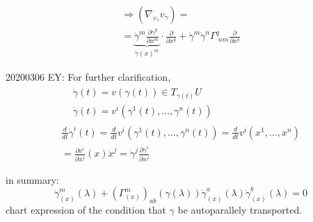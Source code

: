 \[
\begin{gathered}
\Longrightarrow (\nabla_{v_{\gamma}} v_{\gamma}) =  \\
 = \underbrace{ \dot{\gamma}^m \frac{\partial \dot{\gamma}^q }{ \partial x^m} }_{\ddot{\gamma}(x)^m } \cdot \frac{\partial }{ \partial x^q} + \dot{\gamma}^m \dot{\gamma}^n \Gamma^q_{ \, \, nm} \frac{\partial}{\partial x^q}
\end{gathered}
\]

20200306 EY: For further clarification, 
\[
\begin{gathered} 
\begin{aligned} 
 	& \dot{\gamma}(t) = v(\gamma(t)) \in T_{\gamma(t)}U \\ 
	& \dot{\gamma}(t) = v^i(\gamma^1(t), \dots, \gamma^n(t))
\end{aligned} \\ 
 \frac{d}{dt} \dot{\gamma}^i(t) = \frac{d}{dt} v^i(\gamma^1(t), \dots , \gamma^n(t)) = \frac{d}{dt} v^i(x^1 , \dots , x^n) \\
 = \frac{\partial v^i}{\partial x^j}(x) \dot{x}^j = \dot{\gamma}^j \frac{\partial \dot{\gamma}^i}{\partial x^j}
\end{gathered} 
\]

	in summary:
\begin{equation}
\boxed{ 
	\ddot{\gamma}^m_{(x)}(\lambda) + (\Gamma^m_{(x)})_{ab}(\gamma(\lambda)) \dot{\gamma}^a_{(x)}(\lambda) \dot{\gamma}^b_{(x)}(\lambda) = 0  }
\end{equation}
chart expression of the condition that $\gamma$ be autoparallely transported.
	
	
	
	
	
	
	

